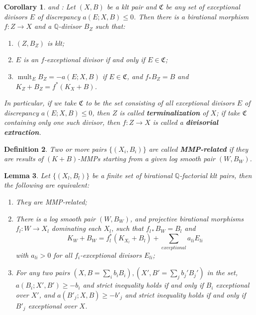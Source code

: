 \documentclass[11pt]{amsart}
\newtheorem{defn}{Definition}[section]
\newtheorem{lem}[defn]{Lemma}
\newtheorem{cor}[defn]{Corollary}
\begin{document}
\begin{cor}\label{extraction}
  \cite[Corollary 13.7]{haconMinimalModelProgram2012} and \cite[Corollary 1.4.3]{BCHM10}: Let $ (X,B) $ be a  klt pair and $\mathfrak{C}$ be any set of exceptional divisors $E$  of discrepancy $ a(E;X,B)\leqslant 0 $. Then there is a birational morphism $ f:Z\to X $ and a $ \mathbb{Q} $-divisor $ B_Z $ such that:
  \begin{enumerate}
    \item $ (Z,B_Z) $ is klt;
    \item $ E $ is an $f$-exceptional divisor if and only if $ E\in \mathfrak{C} $;
    \item $ \operatorname{mult}_{E}B_Z=-a(E;X,B) $ if $E \in \mathfrak{C}$, and $ f_*B_Z=B $ and $ K_Z+B_Z=f^*(K_X+B) $.
  \end{enumerate} 
  In particular, if we take $\mathfrak{C}$ to be the set consisting of  all exceptional divisors $E$ of discrepancy $a(E;X,B)\leqslant 0$, then $ Z $ is called \textbf{terminalization} of $ X $; if take $\mathfrak{C}$ containing only one such divisor, then $ f:Z\to X $ is called a \textbf{divisorial extraction}.    
\end{cor}

\begin{defn}
  \cite[Definition 3.3]{brunoLogSarkisovProgram1995}
  Two or more pairs $ \{(X_i,B_i)\} $ are called \textbf{MMP-related} if they are results of $ (K+B) $-MMPs starting from a given log smooth pair $(W,B_{W})$.
\end{defn}
 \begin{lem}\label{MMPrelatedConditation}
  \cite[Proposition 3.4]{brunoLogSarkisovProgram1995}
  Let $ \{(X_l,B_l)\} $ be a finite set of birational $ \mathbb{Q} $-factorial klt pairs, then the following are equivalent:
  \begin{enumerate}
    \item They are MMP-related;
    \item There is a log smooth pair $ (W,B_W) $, and projective birational morphisms $ f_l:W\to  X_l $ dominating each $ X_l $, such that $ f_{l*}B_W=B_l $ and
      \[ K_W+B_W=f_l^*(K_{X_l}+B_l)+\sum_{exceptional}{a_{li}E_{li}} \]
      with $ a_{li}>0 $ for all $ f_i $-exceptional divisors $E_{li}$;
    \item For any two pairs $ (X,B=\sum_ib_iB_i),(X',B'=\sum _jb_j'B_j') $ in the set,  $ a(B_i;X',B')\geqslant -b_i $ and strict inequality holds if and only if $ B_i $ exceptional over $ X' $, and $ a(B'_j;X,B)\geqslant -b'_j $ and strict inequality holds if and only if $ B'_j $ exceptional over $ X $.
  \end{enumerate}
\end{lem}
\end{document}
